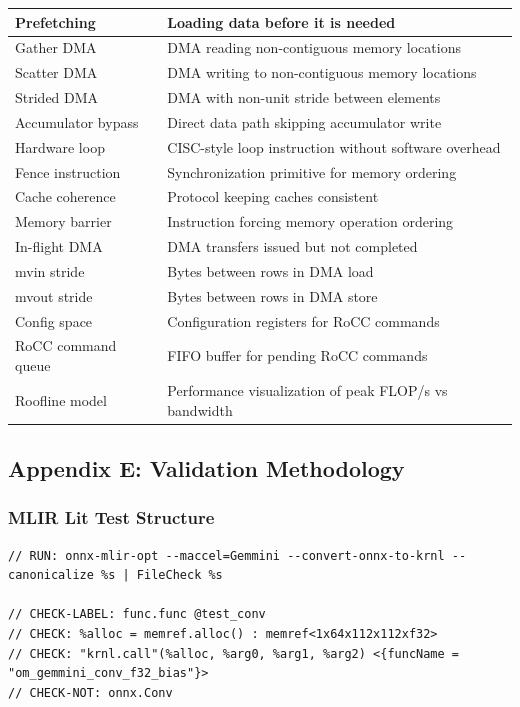 \documentclass[12pt,a4paper]{article}
\begin{document}
\begin{longtable}{|p{}|p{}|}
\hline
Prefetching & Loading data before it is needed \\
\hline
Gather DMA & DMA reading non-contiguous memory locations \\
\hline
Scatter DMA & DMA writing to non-contiguous memory locations \\
\hline
Strided DMA & DMA with non-unit stride between elements \\
\hline
Accumulator bypass & Direct data path skipping accumulator write \\
\hline
Hardware loop & CISC-style loop instruction without software overhead \\
\hline
Fence instruction & Synchronization primitive for memory ordering \\
\hline
Cache coherence & Protocol keeping caches consistent \\
\hline
Memory barrier & Instruction forcing memory operation ordering \\
\hline
In-flight DMA & DMA transfers issued but not completed \\
\hline
mvin stride & Bytes between rows in DMA load \\
\hline
mvout stride & Bytes between rows in DMA store \\
\hline
Config space & Configuration registers for RoCC commands \\
\hline
RoCC command queue & FIFO buffer for pending RoCC commands \\
\hline
Roofline model & Performance visualization of peak FLOP/s vs bandwidth \\
\hline
\end{longtable}

\subsection{Appendix E: Validation Methodology}

\subsubsection{MLIR Lit Test Structure}

\begin{lstlisting}[caption=Example Lit Test]
// RUN: onnx-mlir-opt --maccel=Gemmini --convert-onnx-to-krnl --canonicalize %s | FileCheck %s

// CHECK-LABEL: func.func @test_conv
// CHECK: %alloc = memref.alloc() : memref<1x64x112x112xf32>
// CHECK: "krnl.call"(%alloc, %arg0, %arg1, %arg2) <{funcName = "om_gemmini_conv_f32_bias"}>
// CHECK-NOT: onnx.Conv
\end{lstlisting}
\end{document}
